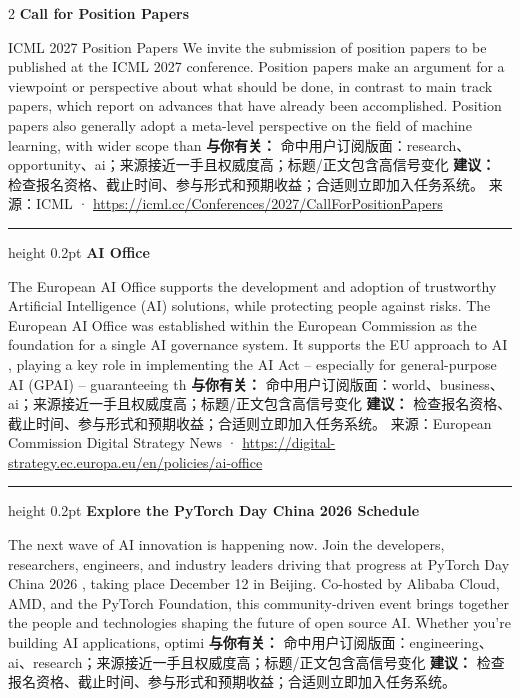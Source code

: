\documentclass[10.5pt]{ctexart}
\begin{document}
\begin{multicols}{2}
{\large\bfseries Call for Position Papers}\par
ICML 2027 Position Papers We invite the submission of position papers to be published at the ICML 2027 conference. Position papers make an argument for a viewpoint or perspective about what should be done, in contrast to main track papers, which report on advances that have already been accomplished. Position papers also generally adopt a meta-level perspective on the field of machine learning, with wider scope than 
\textbf{与你有关：} 命中用户订阅版面：research、opportunity、ai；来源接近一手且权威度高；标题/正文包含高信号变化
\textbf{建议：} 检查报名资格、截止时间、参与形式和预期收益；合适则立即加入任务系统。
{\footnotesize\color{ormuted} 来源：ICML · \url{https://icml.cc/Conferences/2027/CallForPositionPapers}}
\vspace{2mm}
\hrule height 0.2pt
\vspace{2mm}
{\large\bfseries AI Office}\par
The European AI Office supports the development and adoption of trustworthy Artificial Intelligence (AI) solutions, while protecting people against risks. The European AI Office was established within the European Commission as the foundation for a single AI governance system. It supports the EU approach to AI , playing a key role in implementing the AI Act – especially for general-purpose AI (GPAI) – guaranteeing th
\textbf{与你有关：} 命中用户订阅版面：world、business、ai；来源接近一手且权威度高；标题/正文包含高信号变化
\textbf{建议：} 检查报名资格、截止时间、参与形式和预期收益；合适则立即加入任务系统。
{\footnotesize\color{ormuted} 来源：European Commission Digital Strategy News · \url{https://digital-strategy.ec.europa.eu/en/policies/ai-office}}
\vspace{2mm}
\hrule height 0.2pt
\vspace{2mm}
{\large\bfseries Explore the PyTorch Day China 2026 Schedule}\par
The next wave of AI innovation is happening now. Join the developers, researchers, engineers, and industry leaders driving that progress at PyTorch Day China 2026 , taking place December 12 in Beijing. Co-hosted by Alibaba Cloud, AMD, and the PyTorch Foundation, this community-driven event brings together the people and technologies shaping the future of open source AI. Whether you’re building AI applications, optimi
\textbf{与你有关：} 命中用户订阅版面：engineering、ai、research；来源接近一手且权威度高；标题/正文包含高信号变化
\textbf{建议：} 检查报名资格、截止时间、参与形式和预期收益；合适则立即加入任务系统。

\end{multicols}
\end{document}
